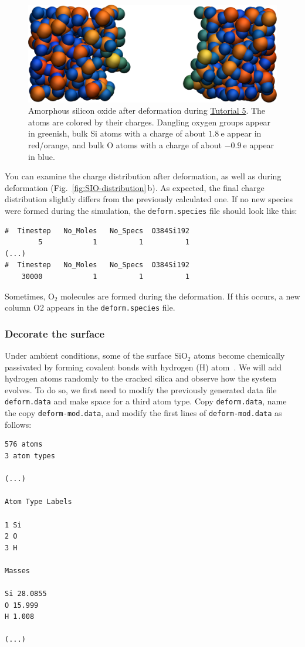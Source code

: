 \documentclass[9pt,tutorial]{livecoms}
\newcommand{\lmpcmd}[1]{\hspace{0pt}\colorbox{listing}{\textcolor{command}{\small{#1}}}\hspace{0pt}} %
\newcommand{\flecmd}[1]{\textcolor{command}{\texttt{#1}}} %
\begin{document}
\begin{figure}
\includegraphics[width=\linewidth]{SIO-deformed}
\caption{Amorphous silicon oxide after deformation during
\hyperref[reactive-silicon-dioxide-label]{Tutorial 5}.  The atoms are colored by their
charges.  Dangling oxygen groups appear in greenish, bulk Si atoms with a charge of
about $1.8~\text{e}$  appear in red/orange, and bulk O atoms with a charge of
about $-0.9 ~ \text{e}$ appear in blue.}
\label{fig:SIO-deformed}
\end{figure}

You can examine the charge distribution after deformation, as well as during
deformation (Fig.~\ref{fig:SIO-distribution}\,b).  As expected, the final
charge distribution slightly differs from the previously calculated one.  If
no new species were formed during the simulation, the \flecmd{deform.species} file
should look like this:
\begin{lstlisting}
#  Timestep   No_Moles   No_Specs  O384Si192
        5            1          1          1
(...)
#  Timestep   No_Moles   No_Specs  O384Si192
    30000            1          1          1
\end{lstlisting}
Sometimes, $\text{O}_2$ molecules are formed during the deformation.  If this occurs,
a new column \lmpcmd{O2} appears in the \flecmd{deform.species} file.

\subsubsection{Decorate the surface}

Under ambient conditions, some of the surface $\text{SiO}_2$ atoms become chemically
passivated by forming covalent bonds with hydrogen (H) atom~\cite{sulpizi2012silica}.
We will add hydrogen atoms randomly to the cracked silica and observe how the
system evolves.  To do so, we first need to modify the previously generated data
file \flecmd{deform.data} and make space for a third atom type.
Copy \flecmd{deform.data}, name the copy \flecmd{deform-mod.data}, and modify the
first lines of \flecmd{deform-mod.data} as follows:
\begin{lstlisting}
576 atoms
3 atom types

(...)

Atom Type Labels

1 Si
2 O
3 H

Masses

Si 28.0855
O 15.999
H 1.008

(...)
\end{lstlisting}
\end{document}
